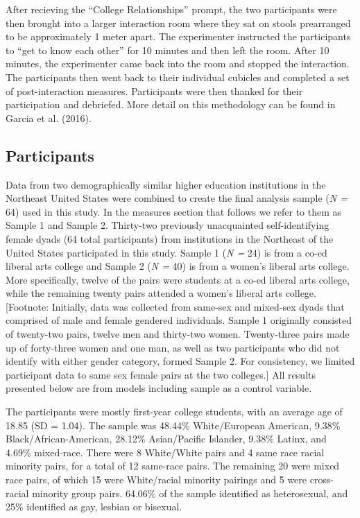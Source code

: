 \documentclass[man]{apa6}
\begin{document}
After recieving the \enquote{College Relationships} prompt, the two
participants were then brought into a larger interaction room where they
sat on stools prearranged to be approximately 1 meter apart. The
experimenter instructed the participants to \enquote{get to know each
other} for 10 minutes and then left the room. After 10 minutes, the
experimenter came back into the room and stopped the interaction. The
participants then went back to their individual cubicles and completed a
set of post-interaction measures. Participants were then thanked for
their participation and debriefed. More detail on this methodology can
be found in Garcia et al. (2016).

\subsection{Participants}\label{participants}

Data from two demographically similar higher education institutions in
the Northeast United States were combined to create the final analysis
sample (\emph{N =} 64) used in this study. In the measures section that
follows we refer to them as Sample 1 and Sample 2. Thirty-two previously
unacquainted self-identifying female dyads (64 total participants) from
institutions in the Northeast of the United States participated in this
study. Sample 1 (\emph{N =} 24) is from a co-ed liberal arts college and
Sample 2 (\emph{N =} 40) is from a women's liberal arts college. More
specifically, twelve of the pairs were students at a co-ed liberal arts
college, while the remaining twenty pairs attended a women's liberal
arts college. {[}Footnote: Initially, data was collected from same-sex
and mixed-sex dyads that comprised of male and female gendered
individuals. Sample 1 originally consisted of twenty-two pairs, twelve
men and thirty-two women. Twenty-three pairs made up of forty-three
women and one man, as well as two participants who did not identify with
either gender category, formed Sample 2. For consistency, we limited
participant data to same sex female pairs at the two colleges.{]} All
results presented below are from models including sample as a control
variable.

The participants were mostly first-year college students, with an
average age of 18.85 (SD = 1.04). The sample was 48.44\% White/European
American, 9.38\% Black/African-American, 28.12\% Asian/Pacific Islander,
9.38\% Latinx, and 4.69\% mixed-race. There were 8 White/White pairs and
4 same race racial minority pairs, for a total of 12 same-race pairs.
The remaining 20 were mixed race pairs, of which 15 were White/racial
minority pairings and 5 were cross-racial minority group pairs. 64.06\%
of the sample identified as heterosexual, and 25\% identified as gay,
lesbian or bisexual.
\end{document}
